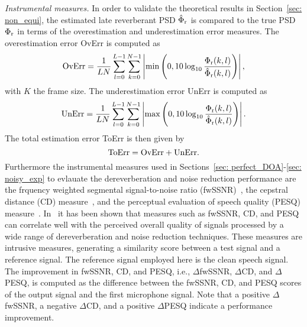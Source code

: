 \documentclass[10pt]{IEEEtran}
\begin{document}
{\emph{Instrumental measures.}} \enspace
In order to validate the theoretical results in Section~\ref{sec: non_equi}, the estimated late reverberant PSD $\hat{\Phi}_{\rm r}$ is compared to the true PSD $\Phi_{\rm r}$ in terms of the overestimation and underestimation error measures.
The overestimation error OvErr is computed as
\begin{equation}
\label{eq: ov_err}
{\rm OvErr} = \frac{1}{L N} \sum_{l = 0}^{L-1} \sum_{k = 0}^{N-1} \left| \min \left(0, 10 \log_{10} \frac{\Phi_{\rm r}(k,l)}{\hat{\Phi}_{\rm r}(k,l)} \right) \right|,
\end{equation}
with $K$ the frame size.
The underestimation error UnErr is computed as
\begin{equation}
\label{eq: un_err}
{\rm UnErr} = \frac{1}{L N} \sum_{l = 0}^{L-1} \sum_{k = 0}^{N-1} \left| \max \left(0, 10 \log_{10} \frac{\Phi_{\rm r}(k,l)}{\hat{\Phi}_{\rm r}(k,l)} \right) \right|.
\end{equation}
The total estimation error ToErr is then given by
\begin{equation}
{\rm ToErr} = {\rm OvErr} + {\rm UnErr}.
\end{equation}
Furthermore the instrumental measures used in Sections~\ref{sec: perfect_DOA}-\ref{sec: noisy_exp} to evlauate the dereverberation and noise reduction performance are the frquency weighted segmental signal-to-noise ratio (fwSSNR)~\cite{Hu_ITASLP_2008}, the cepstral distance (CD) measure~\cite{Quackenbush_book}, and the perceptual evaluation of speech quality (PESQ) measure~\cite{PESQ}.
In~\cite{REVERB2016} it has been shown that measures such as fwSSNR, CD, and PESQ can correlate well with the perceived overall quality of signals processed by a wide range of dereverberation and noise reduction techniques.
These measures are intrusive measures, generating a similarity score between a test signal and a reference signal.
The reference signal employed here is the clean speech signal. 
The improvement in fwSSNR, CD, and PESQ, i.e., $\Delta$fwSSNR, $\Delta$CD, and $\Delta$PESQ, is computed as the difference between the fwSSNR, CD, and PESQ scores of the output signal and the first microphone signal.
Note that a positive $\Delta$fwSSNR, a negative $\Delta$CD, and a positive $\Delta$PESQ indicate a performance improvement.
\end{document}
